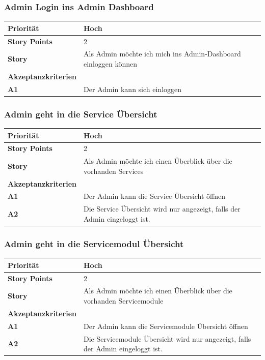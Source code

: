 \documentclass[11pt]{scrartcl}
\begin{document}
 \subsubsection{Admin Login ins Admin Dashboard}
   \begin{tabularx}{\linewidth}{l X}
  \textbf{Priorität} & Hoch\\
  \hline
  \textbf{Story Points} & 2\\
  \hline
  \textbf{Story}& Als Admin möchte ich mich ins Admin-Dashboard einloggen können\\
  \hline
    \textbf{Akzeptanzkriterien} & \\
    \hline
      \textbf{A1} & Der Admin kann sich einloggen\\
  \hline
 \end{tabularx}

 \subsubsection{Admin geht in die Service Übersicht}
 
    \begin{tabularx}{\linewidth}{l X}
  \textbf{Priorität} & Hoch\\
  \hline
  \textbf{Story Points} & 2\\
  \hline
  \textbf{Story}& Als Admin möchte ich einen Überblick über die vorhanden Services\\
  \hline
    \textbf{Akzeptanzkriterien} & \\
    \hline
      \textbf{A1} & Der Admin kann die Service Übersicht öffnen\\
  \hline
    \textbf{A2} & Die Service Übersicht wird nur angezeigt, falls der Admin eingeloggt ist.\\
  \hline
 \end{tabularx}

 \subsubsection{Admin geht in die Servicemodul Übersicht}
 
     \begin{tabularx}{\linewidth}{l X}
  \textbf{Priorität} & Hoch\\
  \hline
  \textbf{Story Points} & 2\\
  \hline
  \textbf{Story}& Als Admin möchte ich einen Überblick über die vorhanden Servicemodule\\
  \hline
    \textbf{Akzeptanzkriterien} & \\
    \hline
      \textbf{A1} & Der Admin kann die Servicemodule Übersicht öffnen\\
  \hline
    \textbf{A2} & Die Servicemodule Übersicht wird nur angezeigt, falls der Admin eingeloggt ist.\\
  \hline
 \end{tabularx}
\end{document}

